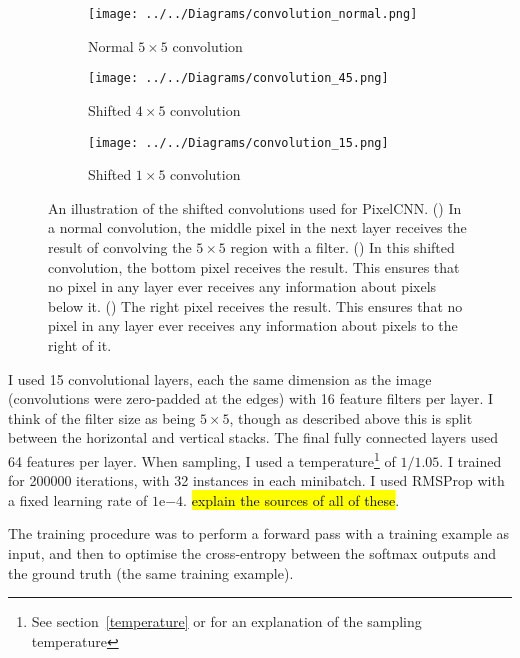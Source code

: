 \documentclass[11pt, a4paper, openany]{book}
\begin{document}
\begin{figure}
  \centering
    \begin{subfigure}{0.3\columnwidth}
        \centering
        \caption{Normal $5\times 5$ convolution}
        \texttt{[image: ../../Diagrams/convolution\_normal.png]} 
        \label{convolutions:normal}
    \end{subfigure}
    \hfill
    \begin{subfigure}{0.3\columnwidth}
        \centering
        \caption{Shifted $4\times 5$ convolution}
        \texttt{[image: ../../Diagrams/convolution\_45.png]} 
        \label{convolutions:45}
    \end{subfigure}
    \hfill
    \begin{subfigure}{0.3\columnwidth}
        \centering
        \caption{Shifted $1\times 5$ convolution}
        \texttt{[image: ../../Diagrams/convolution\_15.png]} 
        \label{convolutions:15}
    \end{subfigure}
  \caption[Shifted convolutions]{An illustration of the shifted convolutions used for PixelCNN. () In a normal convolution, the middle pixel in the next layer receives the result of convolving the $5\times 5$ region with a filter. () In this shifted convolution, the bottom pixel receives the result. This ensures that no pixel in any layer ever receives any information about pixels below it. () The right pixel receives the result. This ensures that no pixel in any layer ever receives any information about pixels to the right of it.}
  \label{convolutions}
\end{figure}

I used 15 convolutional layers, each the same dimension as the image (convolutions were zero-padded at the edges) with 16 feature filters per layer. I think of the filter size as being $5\times 5$, though as described above this is split between the horizontal and vertical stacks. The final fully connected layers used 64 features per layer. When sampling, I used a temperature\footnote{See section~\ref{temperature} or \citet{pixelcnn2} for an explanation of the sampling temperature} of $1/1.05$. I trained for 200000 iterations, with 32 instances in each minibatch. I used RMSProp with a fixed learning rate of $1\mathrm{e}{-4}$. \hl{explain the sources of all of these}.

The training procedure was to perform a forward pass with a training example as input, and then to optimise the cross-entropy between the softmax outputs and the ground truth (the same training example).
\end{document}
